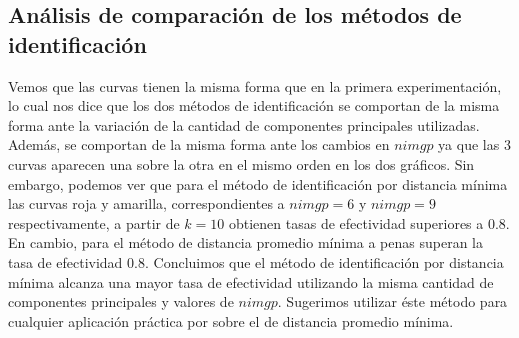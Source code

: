 \subsection{Análisis de comparación de los métodos de identificación}
Vemos que las curvas tienen la misma forma que en la primera experimentación, lo cual nos dice que los dos métodos de identificación
se comportan de la misma forma ante la variación de la cantidad de componentes principales utilizadas. Además, se comportan de la misma
forma ante los cambios en $nimgp$ ya que las 3 curvas aparecen una sobre la otra en el mismo orden en los dos gráficos. Sin embargo, 
podemos ver que para el método de identificación por distancia mínima las curvas roja y amarilla, correspondientes a $nimgp = 6$ y $nimgp = 9$
respectivamente, a partir de $k = 10$ obtienen tasas de efectividad superiores a $0.8$. En cambio, para el método de distancia promedio mínima
a penas superan la tasa de efectividad $0.8$. Concluimos que el método de identificación por distancia mínima alcanza una mayor tasa de 
efectividad utilizando la misma cantidad de componentes principales y valores de $nimgp$. Sugerimos utilizar éste método para cualquier
aplicación práctica por sobre el de distancia promedio mínima.

